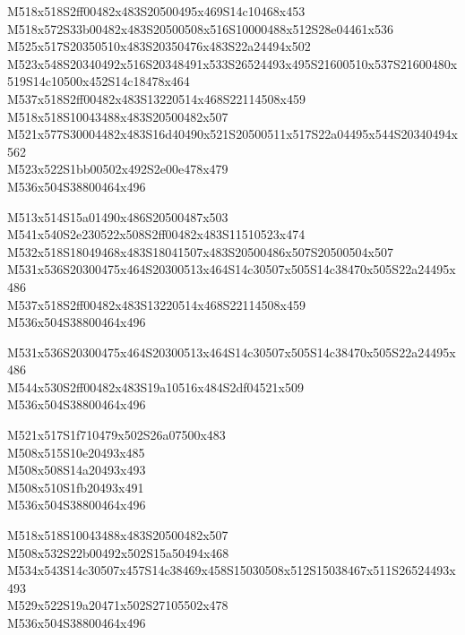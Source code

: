 \documentclass{article}
\begin{document}
\begin{multicols}{5}
\begin{center}
M518x518S2ff00482x483S20500495x469S14c10468x453 %
\\M518x572S33b00482x483S20500508x516S10000488x512S28e04461x536 %
\\M525x517S20350510x483S20350476x483S22a24494x502 %
\\M523x548S20340492x516S20348491x533S26524493x495S21600510x537S21600480x519S14c10500x452S14c18478x464 %
\\M537x518S2ff00482x483S13220514x468S22114508x459 %
\\M518x518S10043488x483S20500482x507 %
\\M521x577S30004482x483S16d40490x521S20500511x517S22a04495x544S20340494x562 %
\\M523x522S1bb00502x492S2e00e478x479 %
\\M536x504S38800464x496 %

M513x514S15a01490x486S20500487x503 %
\\M541x540S2e230522x508S2ff00482x483S11510523x474 %
\\M532x518S18049468x483S18041507x483S20500486x507S20500504x507 %
\\M531x536S20300475x464S20300513x464S14c30507x505S14c38470x505S22a24495x486 %
\\M537x518S2ff00482x483S13220514x468S22114508x459 %
\\M536x504S38800464x496 %

M531x536S20300475x464S20300513x464S14c30507x505S14c38470x505S22a24495x486 %
\\M544x530S2ff00482x483S19a10516x484S2df04521x509 %
\\M536x504S38800464x496 %

M521x517S1f710479x502S26a07500x483 %
\\M508x515S10e20493x485 %
\\M508x508S14a20493x493 %
\\M508x510S1fb20493x491 %
\\M536x504S38800464x496 %

M518x518S10043488x483S20500482x507 %
\\M508x532S22b00492x502S15a50494x468 %
\\M534x543S14c30507x457S14c38469x458S15030508x512S15038467x511S26524493x493 %
\\M529x522S19a20471x502S27105502x478 %
\\M536x504S38800464x496 %


\end{center}
\end{multicols}
\end{document}
